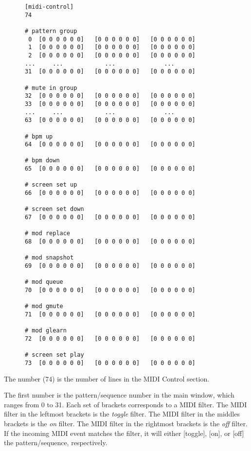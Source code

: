    \begin{verbatim}
      [midi-control]
      74

      # pattern group
       0  [0 0 0 0 0 0]   [0 0 0 0 0 0]   [0 0 0 0 0 0]            
       1  [0 0 0 0 0 0]   [0 0 0 0 0 0]   [0 0 0 0 0 0]          
       2  [0 0 0 0 0 0]   [0 0 0 0 0 0]   [0 0 0 0 0 0]   
      ...     ...            ...              ...
      31  [0 0 0 0 0 0]   [0 0 0 0 0 0]   [0 0 0 0 0 0]    

      # mute in group
      32  [0 0 0 0 0 0]   [0 0 0 0 0 0]   [0 0 0 0 0 0]   
      33  [0 0 0 0 0 0]   [0 0 0 0 0 0]   [0 0 0 0 0 0]   
      ...     ...            ...              ...
      63  [0 0 0 0 0 0]   [0 0 0 0 0 0]   [0 0 0 0 0 0]   

      # bpm up
      64  [0 0 0 0 0 0]   [0 0 0 0 0 0]   [0 0 0 0 0 0]   

      # bpm down
      65  [0 0 0 0 0 0]   [0 0 0 0 0 0]   [0 0 0 0 0 0]   

      # screen set up
      66  [0 0 0 0 0 0]   [0 0 0 0 0 0]   [0 0 0 0 0 0]   

      # screen set down
      67  [0 0 0 0 0 0]   [0 0 0 0 0 0]   [0 0 0 0 0 0]   

      # mod replace
      68  [0 0 0 0 0 0]   [0 0 0 0 0 0]   [0 0 0 0 0 0]   

      # mod snapshot
      69  [0 0 0 0 0 0]   [0 0 0 0 0 0]   [0 0 0 0 0 0]   

      # mod queue
      70  [0 0 0 0 0 0]   [0 0 0 0 0 0]   [0 0 0 0 0 0]   

      # mod gmute
      71  [0 0 0 0 0 0]   [0 0 0 0 0 0]   [0 0 0 0 0 0]   

      # mod glearn
      72  [0 0 0 0 0 0]   [0 0 0 0 0 0]   [0 0 0 0 0 0]   

      # screen set play
      73  [0 0 0 0 0 0]   [0 0 0 0 0 0]   [0 0 0 0 0 0]   
   \end{verbatim}

   The number (74) is the number of lines in the MIDI Control section.

   The first number is the pattern/sequence number in the main window, which
   ranges from 0 to 31.  Each set of brackets corresponds to a MIDI filter.
   The MIDI filter in the leftmost brackets is the \textsl{toggle} filter.
   The MIDI filter in the middles brackets is the \textsl{on} filter.
   The MIDI filter in the rightmost brackets is the \textsl{off} filter.
   If the incoming MIDI event matches the filter, it will either [toggle],
   [on], or [off] the pattern/sequence, respectively.


